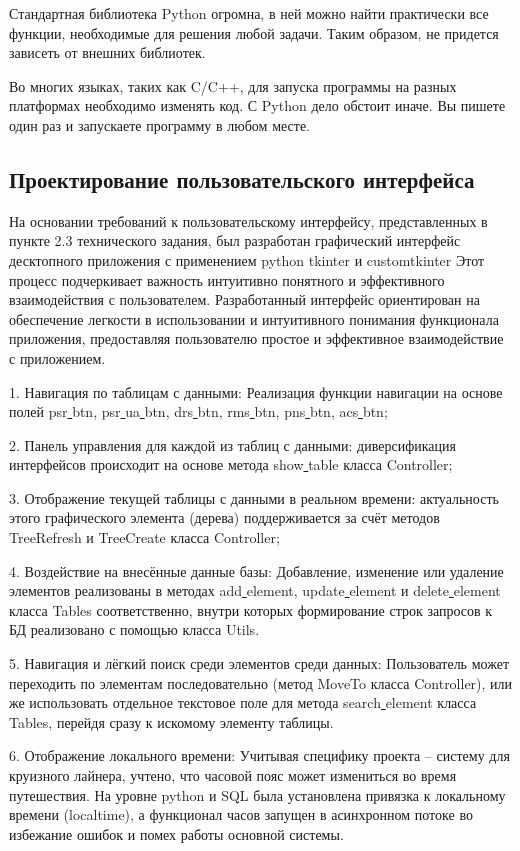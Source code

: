 Стандартная библиотека Python огромна, в ней можно найти практически все функции, необходимые для решения любой задачи. Таким образом, не придется зависеть от внешних библиотек.

Во многих языках, таких как C/C++, для запуска программы на разных платформах необходимо изменять код. С Python дело обстоит иначе. Вы пишете один раз и запускаете программу в любом месте.

\subsection{Проектирование пользовательского интерфейса}
На основании требований к пользовательскому интерфейсу, представленных в пункте 2.3 технического задания, был разработан графический интерфейс десктопного приложения с применением python tkinter и customtkinter Этот процесс подчеркивает важность интуитивно понятного и эффективного взаимодействия с пользователем. Разработанный интерфейс ориентирован на обеспечение легкости в использовании и интуитивного понимания функционала приложения, предоставляя пользователю простое и эффективное взаимодействие с приложением.

1. Навигация по таблицам с данными: Реализация функции навигации на основе полей psr\underline{ }btn, psr\underline{ }ua\underline{ }btn, drs\underline{ }btn, rms\underline{ }btn, pns\underline{ }btn, acs\underline{ }btn;

2. Панель управления для каждой из таблиц с данными: диверсификация интерфейсов происходит на основе метода show\underline{ }table класса Controller;

3. Отображение текущей таблицы с данными в реальном времени: актуальность этого графического элемента (дерева) поддерживается за счёт методов TreeRefresh и TreeCreate класса Controller;

4. Воздействие на внесённые данные базы: Добавление, изменение или удаление элементов реализованы в методах add\underline{ }element, update\underline{ }element и delete\underline{ }element класса Tables соответственно, внутри которых формирование строк запросов к БД реализовано с помощью класса Utils.

5. Навигация и лёгкий поиск среди элементов среди данных: Пользователь может переходить по элементам последовательно (метод MoveTo класса Controller), или же использовать отдельное текстовое поле для метода search\underline{ }element класса Tables, перейдя сразу к искомому элементу таблицы.

6. Отображение локального времени: Учитывая специфику проекта -- систему для круизного лайнера, учтено, что часовой пояс может измениться во время путешествия. На уровне python и SQL была установлена привязка к локальному времени (localtime), а функционал часов запущен в асинхронном потоке во избежание ошибок и помех работы основной системы.


